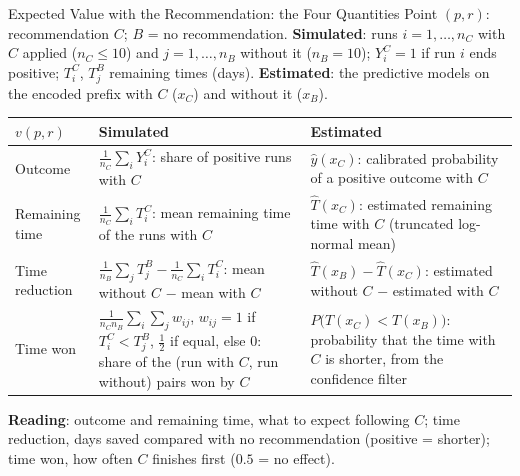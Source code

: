 \documentclass[aspectratio=169]{beamer} %
\begin{document}
\begin{frame}{Expected Value with the Recommendation: the Four Quantities}
  \scriptsize\setlength{\aboverulesep}{0pt}\setlength{\belowrulesep}{1pt}
  Point $(p, r)$: recommendation $C$; $B$ = no recommendation. \textbf{Simulated}: runs $i = 1, \dots, n_C$ with $C$
  applied ($n_C \le 10$) and $j = 1, \dots, n_B$ without it ($n_B = 10$); $Y^C_i = 1$ if run $i$ ends positive;
  $T^C_i$, $T^B_j$ remaining times (days). \textbf{Estimated}: the predictive models on the encoded prefix with $C$
  ($x_C$) and without it ($x_B$).
  \begin{center}\setlength{\tabcolsep}{4pt}\renewcommand{\arraystretch}{1.15}
  \begin{tabular}{p{1.9cm} p{4.6cm} p{4.6cm}}
    \toprule
    $v(p,r)$ & Simulated & Estimated \\
    \midrule
    Outcome
      & $\frac{1}{n_C}\sum_i Y^C_i$: share of positive runs with $C$
      & $\hat{y}(x_C)$: calibrated probability of a positive outcome with $C$ \\
    Remaining time
      & $\frac{1}{n_C}\sum_i T^C_i$: mean remaining time of the runs with $C$
      & $\hat{T}(x_C)$: estimated remaining time with $C$ (truncated log-normal mean) \\
    Time reduction
      & $\frac{1}{n_B}\sum_j T^B_j - \frac{1}{n_C}\sum_i T^C_i$: mean without $C$ $-$ mean with $C$
      & $\hat{T}(x_B) - \hat{T}(x_C)$: estimated without $C$ $-$ estimated with $C$ \\
    Time won
      & $\frac{1}{n_C n_B}\sum_i\sum_j w_{ij}$, $w_{ij} = 1$ if $T^C_i < T^B_j$, $\tfrac12$ if equal, else $0$: share of the
        (run with $C$, run without) pairs won by $C$
      & $P\big(T(x_C) < T(x_B)\big)$: probability that the time with $C$ is shorter, from the confidence filter \\
    \bottomrule
  \end{tabular}
  \end{center}
  \textbf{Reading}: outcome and remaining time, what to expect following $C$; time reduction, days saved compared with
  no recommendation (positive = shorter); time won, how often $C$ finishes first ($0.5$ = no effect).
\end{frame}

\newcommand{\agreementtable}[5]{%
  \begin{minipage}[t]{0.32\textwidth}\vspace{0pt}\centering
    \textbf{#1}\par\vspace{1pt}
    \setlength{\aboverulesep}{0pt}\setlength{\belowrulesep}{1pt}\setlength{\tabcolsep}{4pt}
    \begin{tabular}{lrr}
      \toprule
       & sim.\ yes & sim.\ no \\
      \midrule
      est.\ yes & #2 & #3 \\
      est.\ no  & #4 & #5 \\
      \bottomrule
    \end{tabular}
  \end{minipage}}
\end{document}

